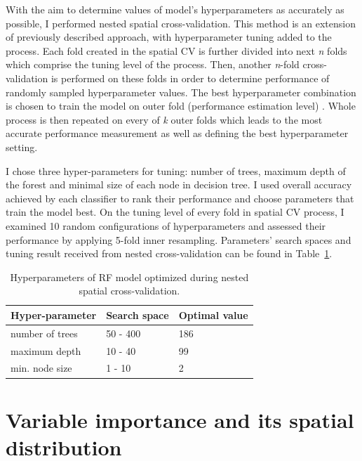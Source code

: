 \documentclass{amuthesis}
\begin{document}
With the aim to determine values of model's hyperparameters as
accurately as possible, I performed nested spatial cross-validation.
This method is an extension of previously described approach, with
hyperparameter tuning added to the process. Each fold created in the
spatial CV is further divided into next \emph{n} folds which comprise
the tuning level of the process. Then, another \emph{n}-fold
cross-validation is performed on these folds in order to determine
performance of randomly sampled hyperparameter values. The best
hyperparameter combination is chosen to train the model on outer fold
(performance estimation level) \autocite{schratz_hyperparameter_2019}.
Whole process is then repeated on every of \emph{k} outer folds which
leads to the most accurate performance measurement as well as defining
the best hyperparameter setting.

I chose three hyper-parameters for tuning: number of trees, maximum
depth of the forest and minimal size of each node in decision tree. I
used overall accuracy achieved by each classifier to rank their
performance and choose parameters that train the model best. On the
tuning level of every fold in spatial CV process, I examined 10 random
configurations of hyperparameters and assessed their performance by
applying 5-fold inner resampling. Parameters' search spaces and tuning
result received from nested cross-validation can be found in
Table~\ref{tbl-tabela3}.

\hypertarget{tbl-tabela3}{}
\begin{table}
\caption{\label{tbl-tabela3}Hyperparameters of RF model optimized during nested spatial
cross-validation. }\tabularnewline

\centering
\begin{tabular}{|>{}l|>{}l|>{}l|}
\toprule
\textbf{Hyper-parameter} & \textbf{Search space} & \textbf{Optimal value}\\
\midrule
number of trees & 50 - 400 & 186\\
\hline
maximum depth & 10 - 40 & 99\\
\hline
min. node size & 1 - 10 & 2\\
\bottomrule
\end{tabular}
\end{table}

\hypertarget{sec-importance}{%
\section{Variable importance and its spatial
distribution}\label{sec-importance}}
\end{document}
